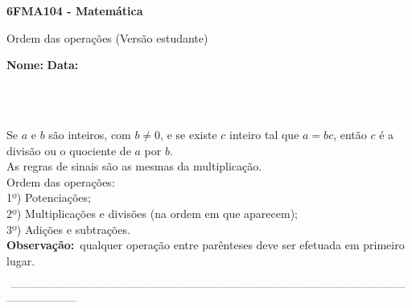 \documentclass[a4paper,14pt]{article}
\begin{document}
	
	\noindent\textbf{6FMA104 - Matemática} 
	
	\begin{center}Ordem das operações (Versão estudante)
	\end{center}
	
	\noindent\textbf{Nome:} \underline{\hspace{10cm}}
	\noindent\textbf{Data:} \underline{\hspace{4cm}}
	
	~ \\ ~
	\begin{multicols}{2}
		\noindent Se $a$ e $b$ são inteiros, com $b \neq 0$, e se existe $c$ inteiro tal que $a = bc$, então $c$ é a divisão ou o quociente de $a$ por $b$. \\
		As regras de sinais são as mesmas da multiplicação. \\
		Ordem das operações: \\
		1º) Potenciações; \\
		2º) Multiplicações e divisões (na ordem em que aparecem); \\
		3º) Adições e subtrações. \\
		\textbf{Observação:}~qualquer operação entre parênteses deve ser efetuada em primeiro lugar.
	\end{multicols}
	\noindent\textsubscript{~-----------------------------------------------------------------------------------------------------------------------------------------------------}
\end{document}
